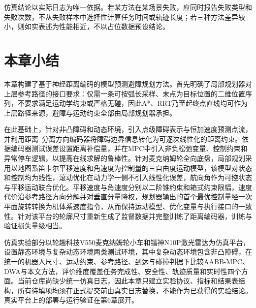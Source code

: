 仿真结论以实际日志为唯一依据。若某方法在某场景失败，应同时报告失败类型和失败次数，不从失败样本中选择性计算任务时间或轨迹长度；若三种方法差异较小，则如实表述为性能相近，不以占位数据预设结论。

\section{本章小结}
本章构建了基于神经距离编码的模型预测避障规划方法。首先明确了局部规划器对上层参考路径的接口要求：仅需一条可按弧长采样、末点为目标位置的二维位置序列，不要求满足运动学约束或严格无碰，因此A*、RRT乃至起终点直线均可作为上层路径来源，避障与运动约束全部由局部规划器承担。

在此基础上，针对非凸障碍和动态环境，引入点级障碍表示与恒加速度预测点流，并利用距离--分离方向编码器将障碍边界信息转化为可逐次线性化的距离约束。依据编码器测试误差设置距离补偿量，并在MPC中引入非负松弛变量、控制约束和异常停车逻辑，以提高在线求解的鲁棒性。针对麦克纳姆轮全向底盘，局部规划采用以地图系笛卡尔平移速度和角速度为控制量的三自由度运动模型，该模型对状态和控制均为线性，滚动优化在动力学一侧不引入线性化误差，航向角作为可控状态与平移运动联合优化。平移速度与角速度分别以二阶锥约束和箱式约束限幅，速度代价沿参考路径方向分解并对垂直分量降权，规划器输出的首个最优控制量经一次平面旋转转换为机体系速度指令，从而保持运动模型、优化变量与执行接口的一致性。针对该平台的轮廓尺寸重新生成了监督数据并完整训练了距离编码器，训练与验证损失量级相当。

仿真实验部分以轮趣科技V550麦克纳姆轮小车和镭神N10P激光雷达为仿真平台，设置静态环境与复杂动态环境两类测试环境，其中复杂动态环境包含非凸障碍，在统一的机器人尺寸、运动约束、参考路径、到达与碰撞判据下比较AABB-MPC、DWA与本文方法，评价维度覆盖任务完成性、安全性、轨迹质量和实时性四个方面。当前仓库尚缺少统一仿真日志，因此本章只建立实验协议、指标和结果表结构，所有待填项均须在正式提交前由真实日志替换，不能作为已获得的实验结论。真实平台上的部署与运行验证在第6章展开。
